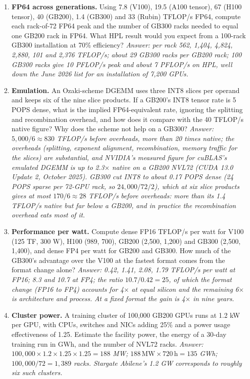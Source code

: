 \documentclass[11pt,letterpaper]{article}
\begin{document}
\begin{enumerate}[leftmargin=1.6em,itemsep=6pt]
\item \textbf{FP64 across generations.} Using 7.8 (V100), 19.5 (A100 tensor), 67 (H100 tensor), 40 (GB200), 1.4 (GB300) and 33 (Rubin) TFLOP/s FP64, compute each rack-of-72 FP64 peak and the number of GB300 racks needed to equal one GB200 rack in FP64. What HPL result would you expect from a 100-rack GB300 installation at 70\% efficiency? \emph{Answer: per rack 562, 1{,}404, 4{,}824, 2{,}880, 101 and 2{,}376 TFLOP/s; about 29 GB300 racks per GB200 rack; 100 GB300 racks give 10 PFLOP/s peak and about 7 PFLOP/s on HPL, well down the June 2026 list for an installation of 7{,}200 GPUs.}
\item \textbf{Emulation.} An Ozaki-scheme DGEMM uses three INT8 slices per operand and keeps six of the nine slice products. If a GB200's INT8 tensor rate is 5 POPS dense, what is the implied FP64-equivalent rate, ignoring the splitting and recombination overhead, and how does it compare with the 40 TFLOP/s native figure? Why does the scheme not help on a GB300? \emph{Answer: $5{,}000/6 \approx 830$ TFLOP/s before overheads, more than 20 times native; the overheads (splitting, exponent alignment, recombination, memory traffic for the slices) are substantial, and NVIDIA's measured figure for cuBLAS's emulated DGEMM is up to 2.3$\times$ native on a GB200 NVL72 (CUDA 13.0 Update 2, October 2025). GB300 cut INT8 to about 0.17 POPS dense (24 POPS sparse per 72-GPU rack, so $24{,}000/72/2$), which at six slice products gives at most $170/6 \approx 28$ TFLOP/s before overheads: more than its 1.4 TFLOP/s native but far below a GB200, and in practice the recombination overhead eats most of it.}
\item \textbf{Performance per watt.} Compute dense FP16 TFLOP/s per watt for V100 (125 TF, 300 W), H100 (989, 700), GB200 (2,500, 1,200) and GB300 (2,500, 1,400), and dense FP4 per watt for GB200 and GB300. How much of the GB300's advantage over the V100 at the fastest format comes from the format change alone? \emph{Answer: 0.42, 1.41, 2.08, 1.79 TFLOP/s per watt at FP16; 8.3 and 10.7 at FP4; the ratio $10.7/0.42 = 25$, of which the format change (FP16 to FP4) accounts for 4$\times$ at equal silicon and the remaining 6$\times$ is architecture and process. At a fixed format the gain is 4$\times$ in nine years.}
\item \textbf{Cluster power.} A training cluster of 100{,}000 GB200 GPUs runs at 1.2 kW per GPU, with CPUs, switches and NICs adding 25\% and a power usage effectiveness of 1.25. Estimate the facility power, the energy of a 30-day training run in GWh, and the number of NVL72 racks. \emph{Answer: $100{,}000\times 1.2\times 1.25\times 1.25 = 188$ MW; $188\,\mathrm{MW}\times 720\,\mathrm{h} = 135$ GWh; $100{,}000/72 = 1{,}389$ racks. Stargate Abilene's 1.2 GW corresponds to roughly six such clusters.}

\end{enumerate}
\end{document}

